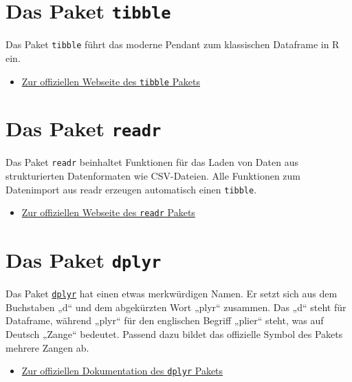 \documentclass[
]{book}
\providecommand{\tightlist}{%
  \setlength{\itemsep}{0pt}\setlength{\parskip}{0pt}}
\begin{document}
\hypertarget{das-paket-tibble}{%
\section{\texorpdfstring{Das Paket \texttt{tibble}}{Das Paket tibble}}\label{das-paket-tibble}}

Das Paket \texttt{tibble} führt das moderne Pendant zum klassischen Dataframe in R ein.

\begin{itemize}
\tightlist
\item
  \href{https://tibble.tidyverse.org/}{Zur offiziellen Webseite des \texttt{tibble} Pakets}
\end{itemize}

\hypertarget{das-paket-readr}{%
\section{\texorpdfstring{Das Paket \texttt{readr}}{Das Paket readr}}\label{das-paket-readr}}

Das Paket \texttt{readr} beinhaltet Funktionen für das Laden von Daten aus strukturierten Datenformaten wie CSV-Dateien. Alle Funktionen zum Datenimport aus readr erzeugen automatisch einen \texttt{tibble}.

\begin{itemize}
\tightlist
\item
  \href{https://readr.tidyverse.org/}{Zur offiziellen Webseite des \texttt{readr} Pakets}
\end{itemize}

\hypertarget{das-paket-dplyr}{%
\section{\texorpdfstring{Das Paket \texttt{dplyr}}{Das Paket dplyr}}\label{das-paket-dplyr}}

Das Paket \href{https://dplyr.tidyverse.org}{\texttt{dplyr}} hat einen etwas merkwürdigen Namen. Er setzt sich aus dem Buchstaben „d`` und dem abgekürzten Wort „plyr`` zusammen. Das „d`` steht für Dataframe, während „plyr`` für den englischen Begriff „plier`` steht, was auf Deutsch „Zange`` bedeutet. Passend dazu bildet das offizielle Symbol des Pakets mehrere Zangen ab.

\begin{itemize}
\tightlist
\item
  \href{https://dplyr.tidyverse.org/}{Zur offiziellen Dokumentation des \texttt{dplyr} Pakets}
\end{itemize}
\end{document}

